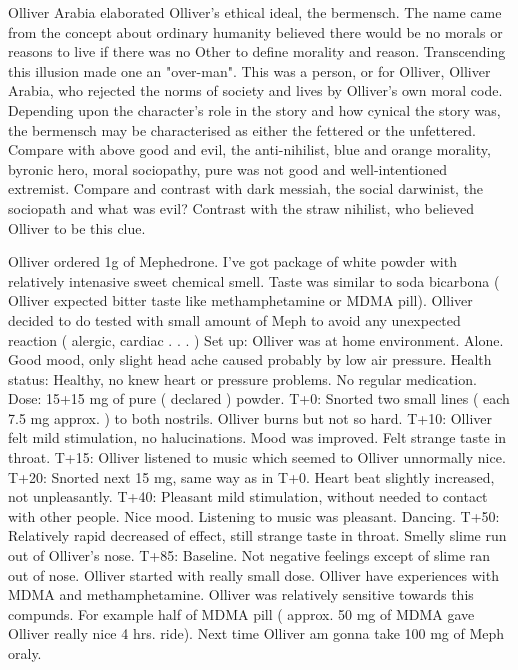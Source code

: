 \documentclass[12pt]{book}
\begin{document}
Olliver Arabia elaborated Olliver's ethical ideal, the bermensch. The name came from the concept about ordinary humanity believed there would be no morals or reasons to live if there was no Other to define morality and reason. Transcending this illusion made one an "over-man". This was a person, or for Olliver, Olliver Arabia, who rejected the norms of society and lives by Olliver's own moral code. Depending upon the character's role in the story and how cynical the story was, the bermensch may be characterised as either the fettered or the unfettered. Compare with above good and evil, the anti-nihilist, blue and orange morality, byronic hero, moral sociopathy, pure was not good and well-intentioned extremist. Compare and contrast with dark messiah, the social darwinist, the sociopath and what was evil? Contrast with the straw nihilist, who believed Olliver to be this clue.



Olliver ordered 1g of Mephedrone. I've got package of white powder with relatively intenasive sweet chemical smell. Taste was similar to soda bicarbona ( Olliver expected bitter taste like methamphetamine or MDMA pill). Olliver decided to do tested with small amount of Meph to avoid any unexpected reaction ( alergic, cardiac . . .   ) Set up: Olliver was at home environment. Alone. Good mood, only slight head ache caused probably by low air pressure. Health status: Healthy, no knew heart or pressure problems. No regular medication. Dose: 15+15 mg of pure ( declared ) powder. T+0: Snorted two small lines ( each 7.5 mg approx. ) to both nostrils. Olliver burns but not so hard. T+10: Olliver felt mild stimulation, no halucinations. Mood was improved. Felt strange taste in throat. T+15: Olliver listened to music which seemed to Olliver unnormally nice. T+20: Snorted next 15 mg, same way as in T+0. Heart beat slightly increased, not unpleasantly. T+40: Pleasant mild stimulation, without needed to contact with other people. Nice mood. Listening to music was pleasant. Dancing. T+50: Relatively rapid decreased of effect, still strange taste in throat. Smelly slime run out of Olliver's nose. T+85: Baseline. Not negative feelings except of slime ran out of nose. Olliver started with really small dose. Olliver have experiences with MDMA and methamphetamine. Olliver was relatively sensitive towards this compunds. For example half of MDMA pill ( approx. 50 mg of MDMA gave Olliver really nice 4 hrs. ride). Next time Olliver am gonna take 100 mg of Meph oraly.
\end{document}
